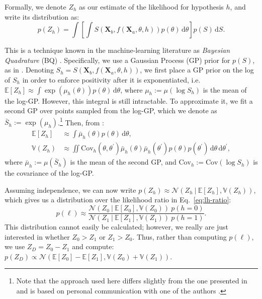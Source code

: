 \documentclass[10pt,letterpaper]{article}
\newcommand{\Xa}[0]{\mathbf{X}_a}
\newcommand{\Xb}[0]{\mathbf{X}_b}
\newcommand{\hi}[0]{h=0}
\newcommand{\hf}[0]{h=1}
\newcommand{\dif}[0]{\,\mathrm{d}}
\begin{document}
Formally, we denote $Z_h$ as our estimate of the likelihood for
hypothesis $h$, and write its distribution as:
\begin{equation}
  p(Z_h) = \int \left[\int S(\Xb, f(\Xa, \theta, h))p(\theta)\dif\theta\right] p(S)\dif S.
\end{equation}

This is a technique known in the machine-learning literature as
\textit{Bayesian Quadrature} (BQ)
\cite{Diaconis:1988uo,OHagan:1991tx,Osborne:2012tm}. Specifically, we
use a Gaussian Process (GP) prior for $p(S)$, as in
.  Denoting $S_h=S(\Xb, f(\Xa, \theta, h))$, we
first place a GP prior on the log of $S_h$ in order to enforce
positivity after it is exponentiated, i.e. $\mathbb{E}[Z_h] \approx
\int \exp(\mu_h(\theta))p(\theta)\dif\theta$, where $\mu_h:=\mu(\log
S_h)$ is the mean of the log-GP.  However, this integral is still
intractable. To approximate it, we fit a second GP over points sampled
from the log-GP, which we denote as
$\bar{S}_h:=\exp(\mu_h)$.\footnote{Note that the approach used here
  differs slightly from the one presented in 
  and is based on personal communication with one of the authors
  \cite{Duvenaud:2013td}.} Then, from :
\begin{align}
  \mathbb{E}[Z_h] &\approx \int \bar{\mu}_h(\theta)p(\theta)\dif\theta,\\
  \mathbb{V}(Z_h) &\approx \iint \mathrm{Cov}_h(\theta,
  \theta^\prime)\bar{\mu}_h(\theta)\bar{\mu}_h(\theta^\prime)p(\theta)p(\theta^\prime)\dif\theta\dif\theta^\prime,
\end{align}
where $\bar{\mu}_h:=\mu(\bar{S}_h)$ is the mean of the second GP, and
$\mathrm{Cov}_h:=\mathrm{Cov}(\log S_h)$ is the covariance of the
log-GP.

Assuming independence, we can now write $p(Z_h)\approx\mathcal{N}(Z_h\
\vert\ \mathbb{E}[Z_h], \mathbb{V}(Z_h))$, which gives us a
distribution over the likelihood ratio in Eq.~\ref{eq:lh-ratio}:
\begin{equation}
p(\ell)\approx\frac{\mathcal{N}(Z_0\ \vert\ \mathbb{E}[Z_0], \mathbb{V}(Z_0))\ p(\hi)}{\mathcal{N}(Z_1\ \vert\ \mathbb{E}[Z_1], \mathbb{V}(Z_1))\ p(\hf)}.
\end{equation}
This distribution cannot easily be calculated; however, we really are
just interested in whether $Z_0>Z_1$ or $Z_1>Z_0$. Thus, rather than
computing $p(\ell)$, we use $Z_D=Z_0-Z_1$ and compute:
$p(Z_D)\propto\mathcal{N}(\mathbb{E}[Z_0] - \mathbb{E}[Z_1],
\mathbb{V}(Z_0) + \mathbb{V}(Z_1))$.
\end{document}
